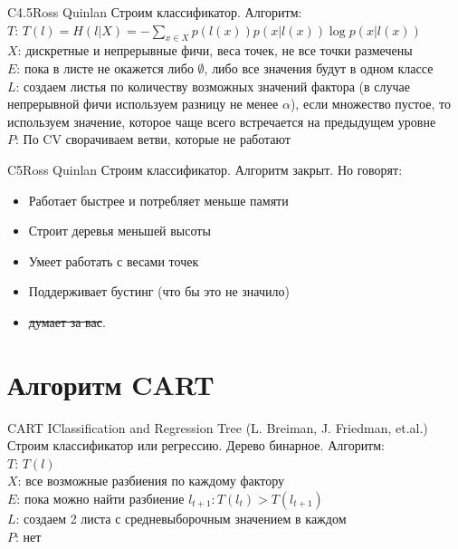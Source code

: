 \documentclass[14pt, fleqn, xcolor={dvipsnames, table}]{beamer}
\begin{document}
\begin{frame}{C4.5}{Ross Quinlan}
\small
Строим классификатор. Алгоритм:\\
{\color{blue}$T$:} $T(l) = H(l|X) = -\sum_{x\in X} p(l(x)) p(x|l(x)) \log p(x|l(x))$\\
{\color{blue}$X$:} дискретные и непрерывные фичи, веса точек, не все точки размечены \\
{\color{blue}$E$:} пока в листе не окажется либо $\emptyset$, либо все значения будут в одном классе \\
{\color{blue}$L$:} создаем листья по количеству возможных значений фактора (в случае непрерывной фичи используем разницу не менее $\alpha$), если множество пустое, то используем значение, которое чаще всего встречается на предыдущем уровне\\
{\color{blue}$P$:} По CV сворачиваем ветви, которые не работают
\end{frame}

\begin{frame}{C5}{Ross Quinlan}
\small
Строим классификатор. Алгоритм закрыт. Но говорят:\\
\begin{itemize}
  \item Работает быстрее и потребляет меньше памяти
  \item Строит деревья меньшей высоты
  \item Умеет работать с весами точек
  \item Поддерживает бустинг (что бы это не значило)
  \item \sout{думает за вас}.
\end{itemize}
\end{frame}

\section{Алгоритм CART}

\begin{frame}{CART I}{Classification and Regression Tree (L. Breiman, J. Friedman, et.al.)}
\small
Строим классификатор или регрессию. Дерево бинарное. Алгоритм:\\
{\color{blue}$T$:} \footnotesize $T(l)$ \\\small
{\color{blue}$X$:} все возможные разбиения по каждому фактору \\
{\color{blue}$E$:} пока можно найти разбиение $l_{t+1}: T(l_t) > T(l_{t+1})$\\
{\color{blue}$L$:} создаем 2 листа с средневыборочным значением в каждом \\
{\color{blue}$P$:} нет
\end{frame}
\end{document}
